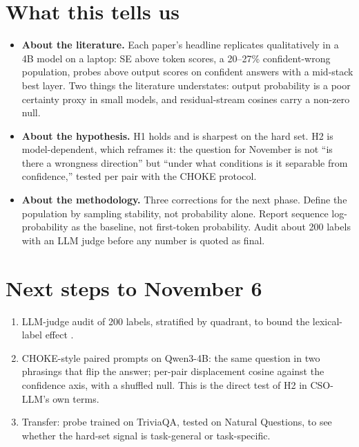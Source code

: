 \documentclass[11pt]{article}
\begin{document}
\section{What this tells us}

\begin{itemize}
  \item \textbf{About the literature.} Each paper's headline replicates qualitatively in a 4B model on a laptop: SE above token scores, a 20--27\% confident-wrong population, probes above output scores on confident answers with a mid-stack best layer. Two things the literature understates: output probability is a poor certainty proxy in small models, and residual-stream cosines carry a non-zero null.
  \item \textbf{About the hypothesis.} H1 holds and is sharpest on the hard set. H2 is model-dependent, which reframes it: the question for November is not ``is there a wrongness direction'' but ``under what conditions is it separable from confidence,'' tested per pair with the CHOKE protocol.
  \item \textbf{About the methodology.} Three corrections for the next phase. Define the population by sampling stability, not probability alone. Report sequence log-probability as the baseline, not first-token probability. Audit about 200 labels with an LLM judge before any number is quoted as final.
\end{itemize}

\section{Next steps to November 6}
\begin{enumerate}
  \item LLM-judge audit of 200 labels, stratified by quadrant, to bound the lexical-label effect \citep{janiak2025illusion}.
  \item CHOKE-style paired prompts on Qwen3-4B: the same question in two phrasings that flip the answer; per-pair displacement cosine against the confidence axis, with a shuffled null. This is the direct test of H2 in CSO-LLM's own terms.
  \item Transfer: probe trained on TriviaQA, tested on Natural Questions, to see whether the hard-set signal is task-general or task-specific.
\end{enumerate}


{\small}
\end{document}
